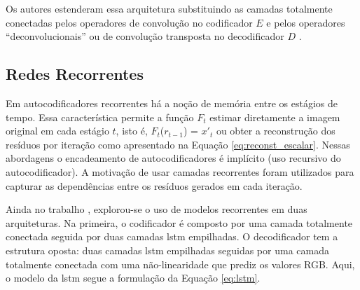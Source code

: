 Os autores estenderam essa arquitetura substituindo as camadas totalmente conectadas pelos operadores de convolução no codificador $E$ e pelos operadores ``deconvolucionais'' ou de convolução transposta no decodificador $D$ \cite{Variable2016Toderici}.




\subsection{Redes Recorrentes}



Em autocodificadores recorrentes há a noção de memória entre os estágios de tempo. Essa característica permite a função  $F_t$  estimar diretamente a imagem original em cada estágio $t$, isto é, $F_t$($r_{t-1}$) = $x'_{t}$ ou obter a reconstrução dos resíduos por iteração como apresentado na Equação \ref{eq:reconst_escalar}. 
Nessas abordagens o encadeamento de autocodificadores é implícito (uso recursivo do autocodificador). A motivação de usar camadas recorrentes foram utilizados para capturar as dependências entre os resíduos gerados em cada iteração. 

Ainda no trabalho \cite{Variable2016Toderici}, explorou-se o uso de modelos recorrentes em duas arquiteturas. Na primeira, o codificador é composto por uma camada totalmente conectada seguida por duas camadas \acrshort{lstm} empilhadas. O decodificador tem a estrutura oposta: duas camadas \acrshort{lstm} empilhadas seguidas por uma camada totalmente conectada com uma não-linearidade que prediz os valores RGB. Aqui, o modelo da \acrshort{lstm} segue a formulação da Equação \ref{eq:lstm}.

